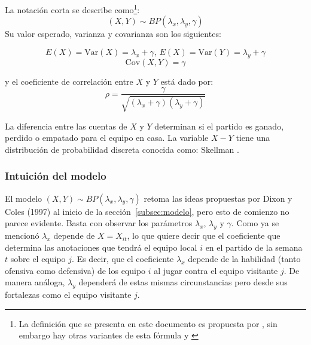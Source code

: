  La notación corta se describe como\footnote{La definición que se presenta en este documento es propuesta por \cite{koopman2013dynamic}, sin embargo hay otras variantes de esta fórmula \cite{kocherlakota1992bivariate} y \cite{johnson1997discrete}}:
 \[(X,Y) \sim BP(\lambda_x,\lambda_y,\gamma)\]
 Su valor esperado, varianza y covarianza son los siguientes:


 \[E(X) = \mathrm{Var}(X) = \lambda_x + \gamma \text{, } E(X) = \mathrm{Var}(Y) = \lambda_y + \gamma\]
 \[\mathrm{Cov}(X,Y) = \gamma\]


 y el coeficiente de correlación entre $X$ y $Y$ está dado por:
 \[\rho = \frac{\gamma}{\sqrt{(\lambda_x+\gamma)(\lambda_y+\gamma)}}\]
 


 La diferencia entre las cuentas de $X$ y $Y$ determinan si el partido es ganado, perdido o empatado para el equipo en casa. La variable $X-Y$ tiene una distribución de probabilidad discreta conocida como: Skellman \cite{skellam1946frequency}.

\subsubsection{Intuición del modelo}
\label{subsubsec:intuicion}
 
 El modelo  $(X,Y) \sim BP(\lambda_x,\lambda_y,\gamma)$ retoma las ideas propuestas por Dixon y Coles (1997) \cite{dixon1997modelling} al inicio de la sección~\ref{subsec:modelo}, pero esto de comienzo no parece evidente.
 Basta con observar los parámetros $\lambda_x$,  $\lambda_y$ y $\gamma$. Como ya se mencionó $\lambda_x$ depende de $X = X_{it}$, lo que quiere decir que el coeficiente que determina las anotaciones que tendrá el equipo local $i$ en el partido de la semana $t$ sobre el equipo $j$. Es decir, que el coeficiente $\lambda_x$ depende de la habilidad (tanto ofensiva como defensiva) de los equipo $i$ al jugar contra el equipo visitante $j$. De manera análoga, $\lambda_y$ dependerá de estas mismas circunstancias pero desde sus fortalezas como el equipo visitante $j$.
 

 
 
 
